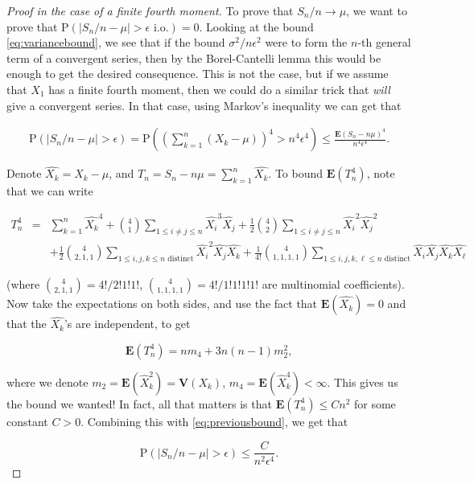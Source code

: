 \documentclass[11pt]{report}
\theoremstyle{plain}
\theoremstyle{definition}
\begin{document}
\begin{proof}[Proof in the case of a finite fourth moment]
To prove that $S_n/n\to \mu$, we want to prove that
$\mathrm{P}(|S_n/n-\mu|>\epsilon\textrm{ i.o.})=0$.
Looking at the bound \eqref{eq:variancebound}, we see that
if the bound $\sigma^2/n\epsilon^2$ were to form the
$n$-th general term of a convergent series, then by
the Borel-Cantelli lemma this would be enough to get
the desired consequence. This is not the case, but if
we assume that $X_1$ has a finite fourth moment, then
we could do a similar trick that \emph{will} give a
convergent series. In that case, using Markov's
inequality we can get that

\begin{align*}
\tag{8}\label{eq:previousbound}
\mathrm{P}(|S_n/n-\mu|>\epsilon) = \mathrm{P}\left(\left( \sum_{k=1}^n (X_k-\mu) \right)^4 > n^4 \epsilon^4\right)
\le \frac{\mathbf{E}(S_n-n\mu)^4}{n^4 \epsilon^4}.
\end{align*}

\noindent Denote $\hat{X_k}=X_k-\mu$, and
$T_n = S_n-n\mu= \sum_{k=1}^n \hat{X_k}$. To bound
$\mathbf{E}(T_n^4)$, note that we can write

\begin{eqnarray*}
T_n^4 &=& \sum_{k=1}^n \hat{X_k}^4 + \binom{4}{1} \sum_{1 \le i\neq j \le n} \hat{X_i}^3 \hat{X_j}
+ \frac12\binom{4}{2}\sum_{1 \le i\neq j \le n} \hat{X_i}^2 \hat{X_j}^2 \\
& & + \frac12\binom{4}{2,1,1} \sum_{1\le i,j,k \le n\textrm{ distinct}} \hat{X_i}^2 \hat{X_j} \hat{X_k}
+ \frac{1}{4!}\binom{4}{1,1,1,1} \sum_{1 \le i,j,k,\ell \le n\textrm{ distinct}} \hat{X_i} \hat{X_j} \hat{X_k} \hat{X_\ell}
\end{eqnarray*}

\noindent (where $\binom{4}{2,1,1}=4!/2!1!1!$,
$\binom{4}{1,1,1,1}=4!/1!1!1!1!$ are multinomial
coefficients). Now take the expectations on both
sides, and use the fact that
$\mathbf{E}(\hat{X_k}) = 0$ and that the $\hat{X_k}$'s
are independent, to get

\[
\mathbf{E}(T_n^4) = n m_4 + 3n(n-1) m_2^2,
\]

\noindent where we denote
$m_2 = \mathbf{E}(\hat{X}_k^2) = \mathbf{V}(X_k)$,
$m_4=\mathbf{E}(\hat{X}_k^4)<\infty$. This gives us
the bound we wanted! In fact, all that matters is that
$\mathbf{E}(T_n^4)\le C n^2$ for some constant $C>0$.
Combining this with \eqref{eq:previousbound}, we get that

\[
\mathrm{P}(|S_n/n-\mu|>\epsilon) \le \frac{C}{n^2 \epsilon^4}.
\]


\end{proof}
\end{document}
